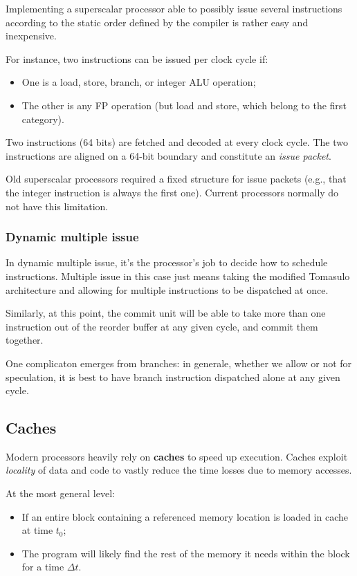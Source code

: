 \documentclass[a4paper,11pt]{article}
\begin{document}
Implementing a superscalar processor able to possibly
issue several instructions according to the static order
defined by the compiler is rather easy and inexpensive.

For instance, two instructions can be issued per clock cycle if:
\begin{itemize}
	\item One is a load, store, branch, or integer ALU
	      operation;
	\item The other is any FP operation (but load and store,
	      which belong to the first category).
\end{itemize}

Two instructions (64 bits) are fetched and decoded at
every clock cycle.
The two instructions are aligned on a 64-bit boundary
and constitute an \textit{issue packet}.

Old superscalar processors required a fixed structure
for issue packets (e.g., that the integer instruction is
always the first one).
Current processors normally do not have this limitation.

\subsubsection{Dynamic multiple issue}

In dynamic multiple issue, it's the processor's job to decide how to schedule instructions.
Multiple issue in this case just means taking the modified Tomasulo architecture and allowing for multiple instructions to be dispatched at once.

Similarly, at this point, the commit unit will be able to take more than one instruction out of the reorder buffer at any given cycle, and commit them together.

One complicaton emerges from branches: in generale, whether we allow or not for speculation, it is best to have branch instruction dispatched alone at any given cycle.

\subsection{Caches}

Modern processors heavily rely on \textbf{caches} to speed up execution.
Caches exploit \textit{locality} of data and code to vastly reduce the time losses due to memory accesses.

At the most general level:
\begin{itemize}
	\item If an entire block containing a referenced memory location is loaded in cache at time $t_0$;
	\item The program will likely find the rest of the memory it needs within the block for a time $\Delta t$.
\end{itemize}
\end{document}
